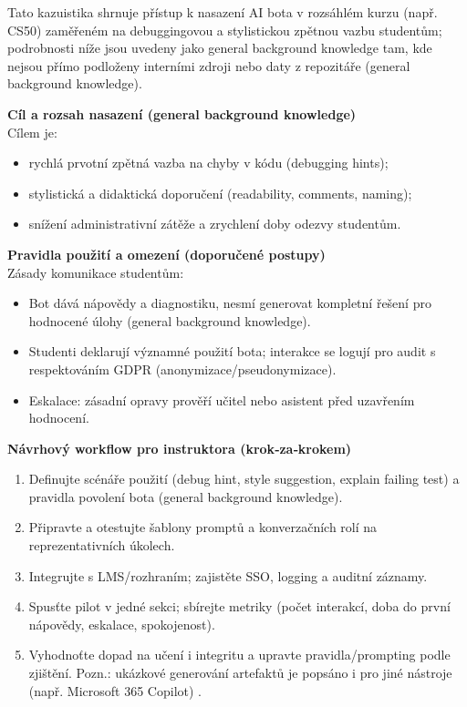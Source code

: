 Tato kazuistika shrnuje přístup k nasazení AI bota v rozsáhlém kurzu (např. CS50) zaměřeném na debuggingovou a stylistickou zpětnou vazbu studentům; podrobnosti níže jsou uvedeny jako general background knowledge tam, kde nejsou přímo podloženy interními zdroji nebo daty z repozitáře (general background knowledge).

\medskip
\textbf{Cíl a rozsah nasazení (general background knowledge)}\\
Cílem je:
\begin{itemize}
  \item rychlá prvotní zpětná vazba na chyby v kódu (debugging hints);
  \item stylistická a didaktická doporučení (readability, comments, naming);
  \item snížení administrativní zátěže a zrychlení doby odezvy studentům.
\end{itemize}

\medskip
\textbf{Pravidla použití a omezení (doporučené postupy)}\\
Zásady komunikace studentům:
\begin{itemize}
  \item Bot dává nápovědy a diagnostiku, nesmí generovat kompletní řešení pro hodnocené úlohy (general background knowledge).
  \item Studenti deklarují významné použití bota; interakce se logují pro audit s respektováním GDPR (anonymizace/pseudonymizace).
  \item Eskalace: zásadní opravy prověří učitel nebo asistent před uzavřením hodnocení.
\end{itemize}

\medskip
\textbf{Návrhový workflow pro instruktora (krok‑za‑krokem)}\\
\begin{enumerate}
  \item Definujte scénáře použití (debug hint, style suggestion, explain failing test) a pravidla povolení bota (general background knowledge).
  \item Připravte a otestujte šablony promptů a konverzačních rolí na reprezentativních úkolech.
  \item Integrujte s LMS/rozhraním; zajistěte SSO, logging a auditní záznamy.
  \item Spusťte pilot v jedné sekci; sbírejte metriky (počet interakcí, doba do první nápovědy, eskalace, spokojenost).
  \item Vyhodnoťte dopad na učení i integritu a upravte pravidla/prompting podle zjištění. Pozn.: ukázkové generování artefaktů je popsáno i pro jiné nástroje (např. Microsoft 365 Copilot) \cite{kb_ai_101_tipu_pdf_04e4a115_page_36_1}.
\end{enumerate}

